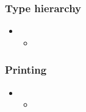 \begin{frame}[fragile]
%
  \frametitle{Type hierarchy}
%
  \begin{itemize}
%
  \item 
    \begin{itemize}
    \item
    \end{itemize}
%
  \end{itemize}
%
\end{frame}

\begin{frame}[fragile]
%
  \frametitle{Printing}
%
  \begin{itemize}
%
  \item 
    \begin{itemize}
    \item
    \end{itemize}
%
  \end{itemize}
%
\end{frame}

